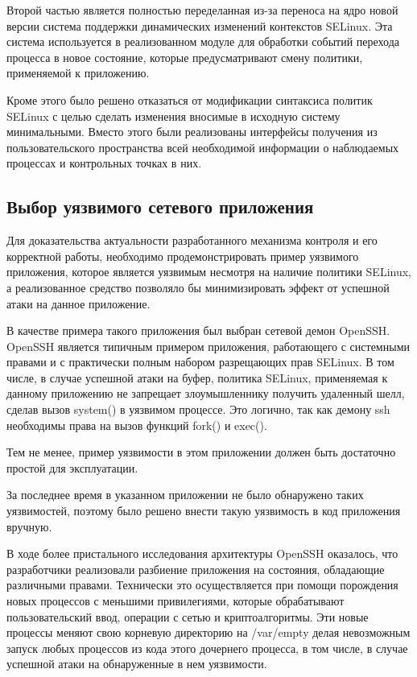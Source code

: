 Второй частью является полностью переделанная из-за переноса 
на ядро новой версии система поддержки динамических изменений
контекстов SELinux. Эта система используется в реализованном 
модуле для обработки событий перехода процесса в новое состояние,
которые предусматривают смену политики, применяемой к приложению. 

Кроме этого было решено отказаться от модификации синтаксиса 
политик SELinux с целью сделать изменения вносимые в исходную 
систему минимальными. Вместо этого были реализованы интерфейсы 
получения из пользовательского пространства всей необходимой 
информации о наблюдаемых процессах и контрольных точках в них.

\subsection{Выбор уязвимого сетевого приложения}
\bigskip

Для доказательства актуальности разработанного механизма 
контроля и его корректной работы, необходимо продемонстрировать
пример уязвимого приложения, которое является уязвимым 
несмотря на наличие политики SELinux, а реализованное средство 
позволяло бы минимизировать эффект от успешной атаки на данное 
приложение. 

В качестве примера такого приложения был выбран сетевой демон OpenSSH.
OpenSSH является типичным примером приложения, работающего с 
системными правами и с практически полным набором разрещающих прав
SELinux. В том числе, в случае успешной атаки на буфер,
политика SELinux, применяемая к данному приложению не запрещает 
злоумышленнику получить удаленный шелл, сделав вызов system() в 
уязвимом процессе. Это логично, так как демону ssh необходимы права
на вызов функций fork() и exec().

Тем не менее, пример уязвимости в этом приложении должен быть достаточно 
простой для эксплуатации. 

За последнее время в указанном приложении не было обнаружено 
таких уязвимостей, поэтому было решено внести такую уязвимость 
в код приложения вручную. 

В ходе более пристального исследования архитектуры OpenSSH 
оказалось, что разработчики реализовали разбиение приложения
на состояния, обладающие различными правами. Технически 
это осуществляется при помощи порождения новых процессов 
с меньшими привилегиями, которые обрабатывают пользовательский 
ввод, операции с сетью и криптоалгоритмы. Эти новые процессы 
меняют свою корневую директорию на /var/empty делая 
невозможным запуск любых процессов из кода этого дочернего процесса, 
в том числе, в случае успешной атаки на обнаруженные в нем уязвимости. 

